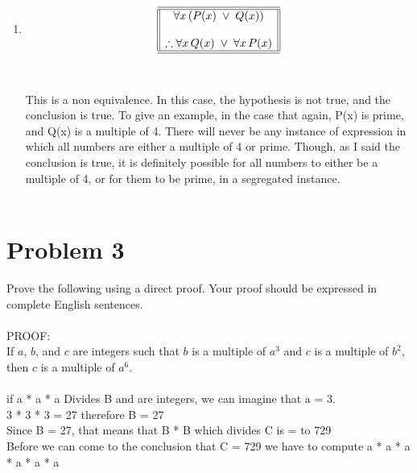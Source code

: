 \begin{enumerate}
\begin{enumerate}[label=(\alph*)]
\item \[
\begin{array}{||c||}
\hline \hline
\forall x\, (P(x)\; \lor \;Q(x) )\\
\\
\therefore \forall x\, Q(x)\; \lor \; \forall x\, P(x) \\
\hline \hline
\end{array}
\]\\\\
 This is a non equivalence. In this case, the hypothesis is not true, and the conclusion is true. To give an example, in the case that again, P(x) is prime, and Q(x) is a multiple of 4. There will never be any instance of expression in which all numbers are either a multiple of 4 or prime. Though, as I said the conclusion is true, it is definitely possible for all numbers to either be a multiple of 4, or for them to be prime, in a segregated instance.
 \\\\
 \end{enumerate}
 \newpage


\section*{Problem 3}

Prove the following using a direct proof. Your proof should be expressed in complete English sentences.
\\\\
PROOF: \\

If $a$, $b$, and $c$ are integers such that $b$ is a multiple of $a^3$ and $c$ is a multiple of $b^2$, then $c$ is a multiple of $a^6$.
\\\\
if a * a * a Divides B and are integers, we can imagine that a = 3. \\

3 * 3 * 3 = 27 therefore B = 27 \\

Since B = 27, that means that B * B which divides C is = to 729 \\

Before we can come to the conclusion that C = 729 we have to compute a * a * a * a * a * a \\


\end{enumerate}
